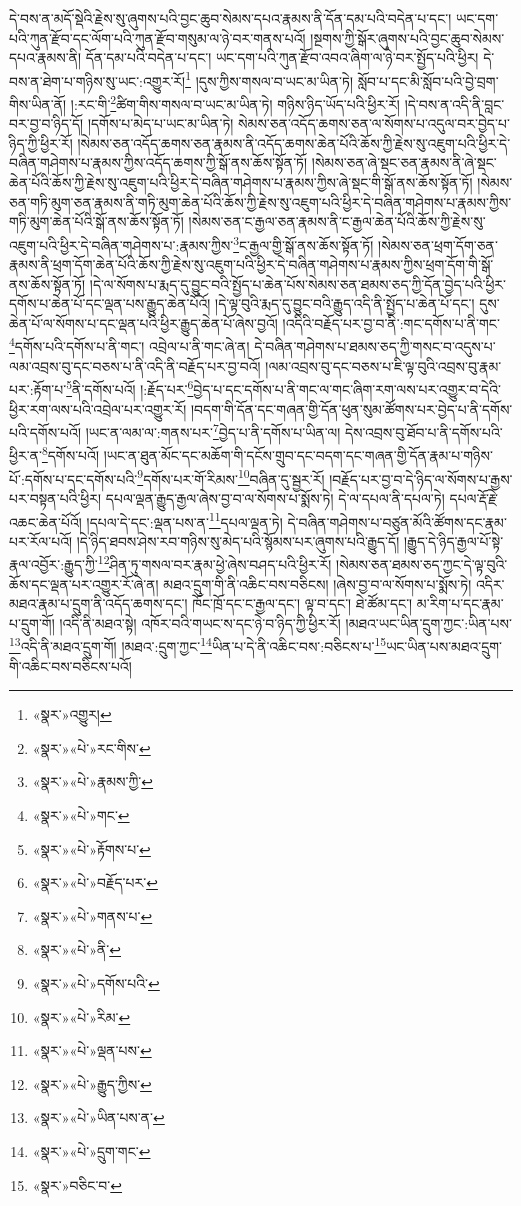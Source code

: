དེ་བས་ན་མདོ་སྡེའི་རྗེས་སུ་ཞུགས་པའི་བྱང་ཆུབ་སེམས་དཔའ་རྣམས་ནི་དོན་དམ་པའི་བདེན་པ་དང་། ཡང་དག་པའི་ཀུན་རྫོབ་དང་ལོག་པའི་ཀུན་རྫོབ་གསུམ་ལ་ཉེ་བར་གནས་པའོ། །སྔགས་ཀྱི་སྒོར་ཞུགས་པའི་བྱང་ཆུབ་སེམས་དཔའ་རྣམས་ནི། དོན་དམ་པའི་བདེན་པ་དང་། ཡང་དག་པའི་ཀུན་རྫོབ་འབའ་ཞིག་ལ་ཉེ་བར་སྤྱོད་པའི་ཕྱིར། དེ་བས་ན་ཐེག་པ་གཉིས་སུ་ཡང་:འགྱུར་རོ།\footnote{«སྣར་»འགྱུར།} །དུས་ཀྱིས་གསལ་བ་ཡང་མ་ཡིན་ཏེ། སློབ་པ་དང་མི་སློབ་པའི་བྱེ་བྲག་གིས་ཡིན་ནོ། །:རང་གི་\footnote{«སྣར་»«པེ་»རང་གིས་}ཚིག་གིས་གསལ་བ་ཡང་མ་ཡིན་ཏེ། གཉིས་ཉིད་ཡོད་པའི་ཕྱིར་རོ། །དེ་བས་ན་འདི་ནི་བླང་བར་བྱ་བ་ཉིད་དོ། །དགོས་པ་མེད་པ་ཡང་མ་ཡིན་ཏེ། སེམས་ཅན་འདོད་ཆགས་ཅན་ལ་སོགས་པ་འདུལ་བར་བྱེད་པ་ཉིད་ཀྱི་ཕྱིར་རོ། །སེམས་ཅན་འདོད་ཆགས་ཅན་རྣམས་ནི་འདོད་ཆགས་ཆེན་པོའི་ཆོས་ཀྱི་རྗེས་སུ་འཇུག་པའི་ཕྱིར་དེ་བཞིན་གཤེགས་པ་རྣམས་ཀྱིས་འདོད་ཆགས་ཀྱི་སྒོ་ནས་ཆོས་སྟོན་ཏོ། །སེམས་ཅན་ཞེ་སྡང་ཅན་རྣམས་ནི་ཞེ་སྡང་ཆེན་པོའི་ཆོས་ཀྱི་རྗེས་སུ་འཇུག་པའི་ཕྱིར་དེ་བཞིན་གཤེགས་པ་རྣམས་ཀྱིས་ཞེ་སྡང་གི་སྒོ་ནས་ཆོས་སྟོན་ཏོ། །སེམས་ཅན་གཏི་མུག་ཅན་རྣམས་ནི་གཏི་མུག་ཆེན་པོའི་ཆོས་ཀྱི་རྗེས་སུ་འཇུག་པའི་ཕྱིར་དེ་བཞིན་གཤེགས་པ་རྣམས་ཀྱིས་གཏི་མུག་ཆེན་པོའི་སྒོ་ནས་ཆོས་སྟོན་ཏོ། །སེམས་ཅན་ང་རྒྱལ་ཅན་རྣམས་ནི་ང་རྒྱལ་ཆེན་པོའི་ཆོས་ཀྱི་རྗེས་སུ་འཇུག་པའི་ཕྱིར་དེ་བཞིན་གཤེགས་པ་:རྣམས་ཀྱིས་\footnote{«སྣར་»«པེ་»རྣམས་ཀྱི་}ང་རྒྱལ་གྱི་སྒོ་ནས་ཆོས་སྟོན་ཏོ། །སེམས་ཅན་ཕྲག་དོག་ཅན་རྣམས་ནི་ཕྲག་དོག་ཆེན་པོའི་ཆོས་ཀྱི་རྗེས་སུ་འཇུག་པའི་ཕྱིར་དེ་བཞིན་གཤེགས་པ་རྣམས་ཀྱིས་ཕྲག་དོག་གི་སྒོ་ནས་ཆོས་སྟོན་ཏོ། །དེ་ལ་སོགས་པ་རྨད་དུ་བྱུང་བའི་སྤྱོད་པ་ཆེན་པོས་སེམས་ཅན་ཐམས་ཅད་ཀྱི་དོན་བྱེད་པའི་ཕྱིར་དགོས་པ་ཆེན་པོ་དང་ལྡན་པས་རྒྱུད་ཆེན་པོའོ། །དེ་ལྟ་བུའི་རྨད་དུ་བྱུང་བའི་རྒྱུད་འདི་ནི་སྤྱོད་པ་ཆེན་པོ་དང་། དུས་ཆེན་པོ་ལ་སོགས་པ་དང་ལྡན་པའི་ཕྱིར་རྒྱུད་ཆེན་པོ་ཞེས་བྱའོ། །འདིའི་བརྗོད་པར་བྱ་བ་ནི་:གང་དགོས་པ་ནི་གང་\footnote{«སྣར་»«པེ་»གང་}དགོས་པའི་དགོས་པ་ནི་གང་། འབྲེལ་པ་ནི་གང་ཞེ་ན། དེ་བཞིན་གཤེགས་པ་ཐམས་ཅད་ཀྱི་གསང་བ་འདུས་པ་ལམ་འབྲས་བུ་དང་བཅས་པ་ནི་འདི་ནི་བརྗོད་པར་བྱ་བའོ། །ལམ་འབྲས་བུ་དང་བཅས་པ་ཇི་ལྟ་བུའི་འབྲས་བུ་རྣམ་པར་:རྟོག་པ་\footnote{«སྣར་»«པེ་»རྟོགས་པ་}ནི་དགོས་པའོ། །:རྗོད་པར་\footnote{«སྣར་»«པེ་»བརྗོད་པར་}བྱེད་པ་དང་དགོས་པ་ནི་གང་ལ་གང་ཞིག་རག་ལས་པར་འགྱུར་བ་དེའི་ཕྱིར་རག་ལས་པའི་འབྲེལ་པར་འགྱུར་རོ། །བདག་གི་དོན་དང་གཞན་གྱི་དོན་ཕུན་སུམ་ཚོགས་པར་བྱེད་པ་ནི་དགོས་པའི་དགོས་པའོ། །ཡང་ན་ལམ་ལ་:གནས་པར་\footnote{«སྣར་»«པེ་»གནས་པ་}བྱེད་པ་ནི་དགོས་པ་ཡིན་ལ། དེས་འབྲས་བུ་ཐོབ་པ་ནི་དགོས་པའི་ཕྱིར་ན་\footnote{«སྣར་»«པེ་»ནི་}དགོས་པའོ། །ཡང་ན་ཐུན་མོང་དང་མཆོག་གི་དངོས་གྲུབ་དང་བདག་དང་གཞན་གྱི་དོན་རྣམ་པ་གཉིས་པོ་:དགོས་པ་དང་དགོས་པའི་\footnote{«སྣར་»«པེ་»དགོས་པའི་}དགོས་པར་གོ་རིམས་\footnote{«སྣར་»«པེ་»རིམ་}བཞིན་དུ་སྦྱར་རོ། །བརྗོད་པར་བྱ་བ་དེ་ཉིད་ལ་སོགས་པ་རྒྱས་པར་བསྟན་པའི་ཕྱིར། དཔལ་ལྡན་རྒྱུད་རྒྱལ་ཞེས་བྱ་བ་ལ་སོགས་པ་སྨོས་ཏེ། དེ་ལ་དཔལ་ནི་དཔལ་ཏེ། དཔལ་རྡོ་རྗེ་འཆང་ཆེན་པོའོ། །དཔལ་དེ་དང་:ལྡན་པས་ན་\footnote{«སྣར་»«པེ་»ལྡན་པས་}དཔལ་ལྡན་ཏེ། དེ་བཞིན་གཤེགས་པ་བཙུན་མོའི་ཚོགས་དང་རྣམ་པར་རོལ་པའོ། །དེ་ཉིད་ཐབས་ཤེས་རབ་གཉིས་སུ་མེད་པའི་སྙོམས་པར་ཞུགས་པའི་རྒྱུད་དོ། །རྒྱུད་དེ་ཉིད་རྒྱལ་པོ་སྟེ་རྣལ་འབྱོར་:རྒྱུད་ཀྱི་\footnote{«སྣར་»«པེ་»རྒྱུད་ཀྱིས་}ཤིན་ཏུ་གསལ་བར་རྣམ་ཕྱེ་ཞེས་བཤད་པའི་ཕྱིར་རོ། །སེམས་ཅན་ཐམས་ཅད་ཀྱང་དེ་ལྟ་བུའི་ཆོས་དང་ལྡན་པར་འགྱུར་རོ་ཞེ་ན། མཐའ་དྲུག་གི་ནི་འཆིང་བས་བཅིངས། །ཞེས་བྱ་བ་ལ་སོགས་པ་སྨོས་ཏེ། འདིར་མཐའ་རྣམ་པ་དྲུག་ནི་འདོད་ཆགས་དང་། ཁོང་ཁྲོ་དང་ང་རྒྱལ་དང་། ལྟ་བ་དང་། ཐེ་ཚོམ་དང་། མ་རིག་པ་དང་རྣམ་པ་དྲུག་གོ། །འདི་ནི་མཐའ་སྟེ། འཁོར་བའི་གཡང་ས་དང་ཉེ་བ་ཉིད་ཀྱི་ཕྱིར་རོ། །མཐའ་ཡང་ཡིན་དྲུག་ཀྱང་:ཡིན་པས་\footnote{«སྣར་»«པེ་»ཡིན་པས་ན་}འདི་ནི་མཐའ་དྲུག་གོ། །མཐའ་:དྲུག་ཀྱང་\footnote{«སྣར་»«པེ་»དྲུག་གང་}ཡིན་པ་དེ་ནི་འཆིང་བས་:བཅིངས་པ་\footnote{«སྣར་»བཅིང་བ་}ཡང་ཡིན་པས་མཐའ་དྲུག་གི་འཆིང་བས་བཅིངས་པའོ། 